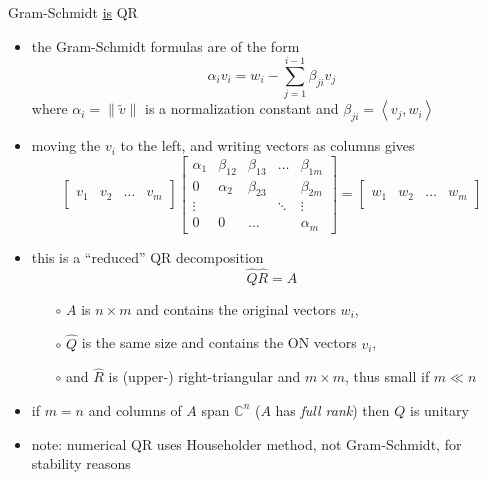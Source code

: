 \documentclass[10pt,hyperref]{beamer}
\newcommand{\CC}{\mathbb{C}}
\newcommand{\ip}[2]{\left<#1,#2\right>}
\newcommand{\trefmatrixthree}[3]{\left[\begin{array}{c|c|c|c} & & & \\ #1 & #2 & \dots & #3 \\ & & & \end{array}\right]}
\begin{document}
\begin{frame}{Gram-Schmidt \underline{is} QR}

\begin{itemize}
\item the Gram-Schmidt formulas are of the form
\small
    $$\alpha_i v_i = w_i - \sum_{j=1}^{i-1} \beta_{ji} v_j$$
\normalsize
where $\alpha_i=\|\tilde v\|$ is a normalization constant and $\beta_{ji}=\ip{v_j}{w_i}$
\item moving the $v_i$ to the left, and writing vectors as columns gives
\small
    $$\trefmatrixthree{v_1}{v_2}{v_m}
      \begin{bmatrix} \alpha_1 & \beta_{12} & \beta_{13} & \dots & \beta_{1m} \\
                      0        & \alpha_2   & \beta_{23} &       & \beta_{2m} \\
                      \vdots   &            &            & \ddots & \vdots \\
                      0        & 0          & \dots      &       & \alpha_m \end{bmatrix}
      = \trefmatrixthree{w_1}{w_2}{w_m}$$
\normalsize
\item this is a ``reduced'' QR decomposition
    $$\hat Q \hat R = A$$

\vspace{-1mm}
    \begin{itemize}
    \item[$\circ$] $A$ is $n\times m$ and contains the original vectors $w_i$,
    \item[$\circ$] $\hat Q$ is the same size and contains the ON vectors $v_i$,
    \item[$\circ$] and  $\hat R$ is (upper-) right-triangular and $m\times m$, thus small if $m\ll n$
    \end{itemize}
\item if $m=n$ and columns of $A$ span $\CC^n$ ($A$ has \emph{full rank}) then $Q$ is unitary

\medskip
\footnotesize
\item note: numerical QR uses Householder method, not Gram-Schmidt, for stability reasons
\end{itemize}
\end{frame}
\end{document}
